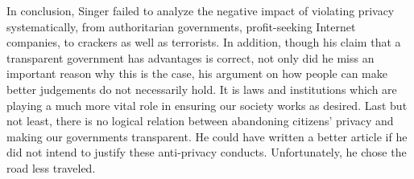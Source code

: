 \documentclass{writing}
\begin{document}
In conclusion, Singer failed to analyze the negative impact of violating
privacy systematically, from authoritarian governments, profit-seeking
Internet companies, to crackers as well as terrorists. In addition,
though his claim that a transparent government has advantages is
correct, not only did he miss an important reason why this is the case,
his argument on how people can make better judgements do not necessarily
hold. It is laws and institutions which are playing a much more vital
role in ensuring our society works as desired. Last but not least, there
is no logical relation between abandoning citizens' privacy and making
our governments transparent. He could have written a better article if
he did not intend to justify these anti-privacy conducts. Unfortunately,
he chose the road less traveled.
\end{document}
